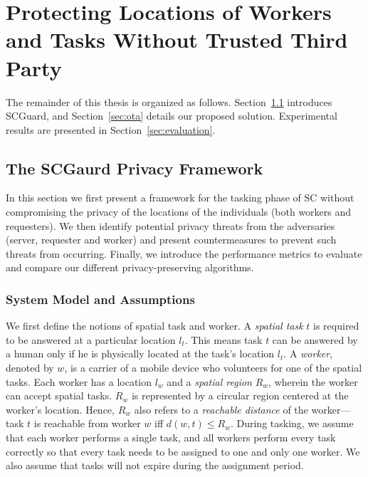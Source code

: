 \documentclass{USC-Thesis}
\numberwithin{equation}{chapter}
\begin{document}
\section{Protecting Locations of Workers and Tasks Without Trusted Third Party}
The remainder of this thesis is organized as follows.
Section~\ref{sec:framework} introduces SCGuard, and Section~\ref{sec:ota} details our proposed solution. Experimental results are presented in Section~\ref{sec:evaluation}.

\subsection{The SCGaurd Privacy Framework}
\label{sec:framework}
In this section we first present a framework for the tasking phase of SC without compromising the privacy of the locations of the individuals (both workers and requesters).
We then identify potential privacy threats from the adversaries (server, requester and worker) and present countermeasures to prevent such threats from occurring.
Finally, we introduce the performance metrics to evaluate and compare our different privacy-preserving algorithms.

\subsubsection{System Model and Assumptions}
\label{sec:system2} 
We first define the notions of spatial task and worker. A \emph{spatial task} $t$ is required to be answered at a particular location $l_t$. This means task $t$ can be answered by a human only if he is physically located at the task's location $l_t$.
A \emph{worker}, denoted by $w$, is a carrier of a mobile device who volunteers for one of the spatial tasks.
Each worker has a location $l_w$ and a \emph{spatial region} $R_w$, wherein the worker can accept spatial tasks. $R_w$ is represented by a circular region centered at the worker's location. Hence, $R_w$ also refers to a \emph{reachable distance} of the worker---task $t$ is reachable from worker $w$ iff $\mathit{d(w,t)\le R_w}$. During tasking, we assume that each worker performs a single task, and all workers perform every task correctly so that every task needs to be assigned to one and only one worker. We also assume that tasks will not expire during the assignment period.
\end{document}
